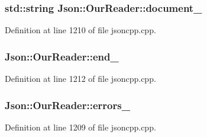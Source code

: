 \subsubsection[{\texorpdfstring{document\+\_\+}{document_}}]{\setlength{\rightskip}{0pt plus 5cm}std\+::string Json\+::\+Our\+Reader\+::document\+\_\+\hspace{0.3cm}{\ttfamily [private]}}\hypertarget{class_json_1_1_our_reader_aeb9b8bb85fa8a4dd72e546bb3104c597}{}\label{class_json_1_1_our_reader_aeb9b8bb85fa8a4dd72e546bb3104c597}


Definition at line 1210 of file jsoncpp.\+cpp.

\subsubsection[{\texorpdfstring{end\+\_\+}{end_}}]{ Json\+::\+Our\+Reader\+::end\+\_\+\hspace{0.3cm}{\ttfamily [private]}}\hypertarget{class_json_1_1_our_reader_ab1f69b0260c27a0d2d65dc56e42c8f9d}{}\label{class_json_1_1_our_reader_ab1f69b0260c27a0d2d65dc56e42c8f9d}


Definition at line 1212 of file jsoncpp.\+cpp.

\subsubsection[{\texorpdfstring{errors\+\_\+}{errors_}}]{ Json\+::\+Our\+Reader\+::errors\+\_\+\hspace{0.3cm}{\ttfamily [private]}}\hypertarget{class_json_1_1_our_reader_afb76b68ba1ab68fe09cf2838e3d4898d}{}\label{class_json_1_1_our_reader_afb76b68ba1ab68fe09cf2838e3d4898d}


Definition at line 1209 of file jsoncpp.\+cpp.

